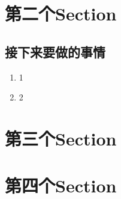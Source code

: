 \documentclass[UTF8,fancyhdr,a4paper]{ctexart}
\begin{document}
\newpage
\section{第二个Section}

\subsection{接下来要做的事情}
\begin{enumerate}
\item 1
\item 2


\end{enumerate}

\newpage
\section{第三个Section}

\newpage
\section{第四个Section}
\end{document}
